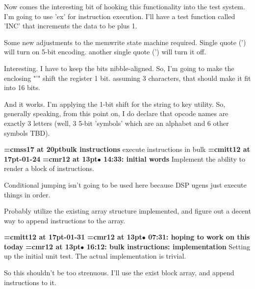 Now comes the interesting bit of hooking this functionality into the test system. I'm going to use 'ex' for instruction execution. I'll have a test function called 'INC' that increments the data to be plus 1.
\par

Some new adjustments to the memwrite state machine required. Single quote (') will turn on 5-bit encoding. another single quote (') will turn it off.
\par

Interesting. I have to keep the bits nibble-aligned. So, I'm going to make the enclosing "'" shift the register 1 bit. assuming 3 characters, that should make it fit into 16 bits.
\par

And it works. I'm applying the 1-bit shift for the string to key utility. So, generally speaking, from this point on, I do declare that opcode names are exactly 3 letters (well, 3 5-bit 'symbols' which are an alphabet and 6 other symbols TBD).
\par

{\medskip\noindent\bf\font\titlefont=cmss17 at 20pt\titlefont bulk instructions}\medskip
execute instructions in bulk
{\medskip\noindent\bf\font\titlefont=cmitt12 at 17pt-01-24}\medskip
{\smallskip\noindent\bf\font\titlefont=cmr12 at 13pt\titlefont $\bullet$ 14:33: initial words}\smallskip
Implement the ability to render a block of instructions.
\par

Conditional jumping isn't going to be used here because DSP ugens just execute things in order.
\par

Probably utilize the existing array structure implemented, and figure out a decent way to append instructions to the array.
\par

{\medskip\noindent\bf\font\titlefont=cmitt12 at 17pt-01-31}\medskip
{\smallskip\noindent\bf\font\titlefont=cmr12 at 13pt\titlefont $\bullet$ 07:31: hoping to work on this today}\smallskip
{\smallskip\noindent\bf\font\titlefont=cmr12 at 13pt\titlefont $\bullet$ 16:12: bulk instructions: implementation}\smallskip
Setting up the initial unit test. The actual implementation is trivial.
\par

So this shouldn't be too strenuous. I'll use the exist block array, and append instructions to it.
\par

